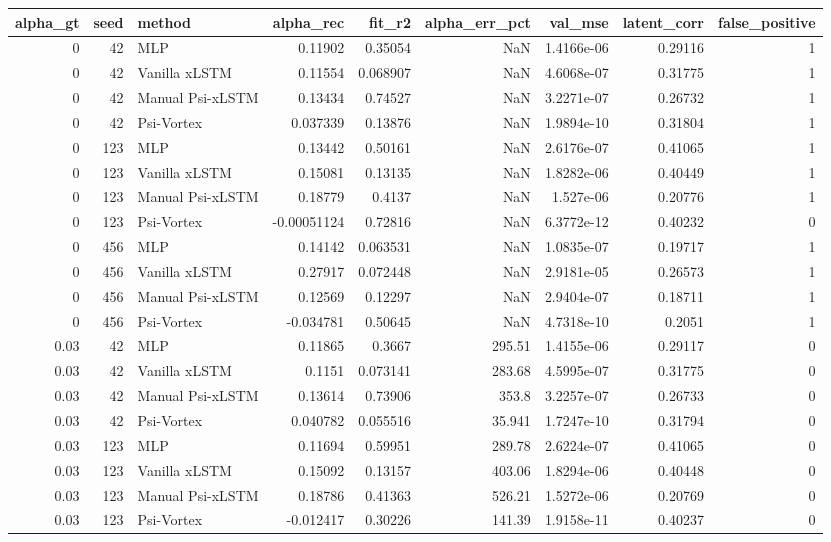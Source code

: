 \begin{tabular}{rrlrrrrrr}
\toprule
alpha_gt & seed & method & alpha_rec & fit_r2 & alpha_err_pct & val_mse & latent_corr & false_positive \\
\midrule
0 & 42 & MLP & 0.11902 & 0.35054 & NaN & 1.4166e-06 & 0.29116 & 1 \\
0 & 42 & Vanilla xLSTM & 0.11554 & 0.068907 & NaN & 4.6068e-07 & 0.31775 & 1 \\
0 & 42 & Manual Psi-xLSTM & 0.13434 & 0.74527 & NaN & 3.2271e-07 & 0.26732 & 1 \\
0 & 42 & Psi-Vortex & 0.037339 & 0.13876 & NaN & 1.9894e-10 & 0.31804 & 1 \\
0 & 123 & MLP & 0.13442 & 0.50161 & NaN & 2.6176e-07 & 0.41065 & 1 \\
0 & 123 & Vanilla xLSTM & 0.15081 & 0.13135 & NaN & 1.8282e-06 & 0.40449 & 1 \\
0 & 123 & Manual Psi-xLSTM & 0.18779 & 0.4137 & NaN & 1.527e-06 & 0.20776 & 1 \\
0 & 123 & Psi-Vortex & -0.00051124 & 0.72816 & NaN & 6.3772e-12 & 0.40232 & 0 \\
0 & 456 & MLP & 0.14142 & 0.063531 & NaN & 1.0835e-07 & 0.19717 & 1 \\
0 & 456 & Vanilla xLSTM & 0.27917 & 0.072448 & NaN & 2.9181e-05 & 0.26573 & 1 \\
0 & 456 & Manual Psi-xLSTM & 0.12569 & 0.12297 & NaN & 2.9404e-07 & 0.18711 & 1 \\
0 & 456 & Psi-Vortex & -0.034781 & 0.50645 & NaN & 4.7318e-10 & 0.2051 & 1 \\
0.03 & 42 & MLP & 0.11865 & 0.3667 & 295.51 & 1.4155e-06 & 0.29117 & 0 \\
0.03 & 42 & Vanilla xLSTM & 0.1151 & 0.073141 & 283.68 & 4.5995e-07 & 0.31775 & 0 \\
0.03 & 42 & Manual Psi-xLSTM & 0.13614 & 0.73906 & 353.8 & 3.2257e-07 & 0.26733 & 0 \\
0.03 & 42 & Psi-Vortex & 0.040782 & 0.055516 & 35.941 & 1.7247e-10 & 0.31794 & 0 \\
0.03 & 123 & MLP & 0.11694 & 0.59951 & 289.78 & 2.6224e-07 & 0.41065 & 0 \\
0.03 & 123 & Vanilla xLSTM & 0.15092 & 0.13157 & 403.06 & 1.8294e-06 & 0.40448 & 0 \\
0.03 & 123 & Manual Psi-xLSTM & 0.18786 & 0.41363 & 526.21 & 1.5272e-06 & 0.20769 & 0 \\
0.03 & 123 & Psi-Vortex & -0.012417 & 0.30226 & 141.39 & 1.9158e-11 & 0.40237 & 0 \\

\end{tabular}
